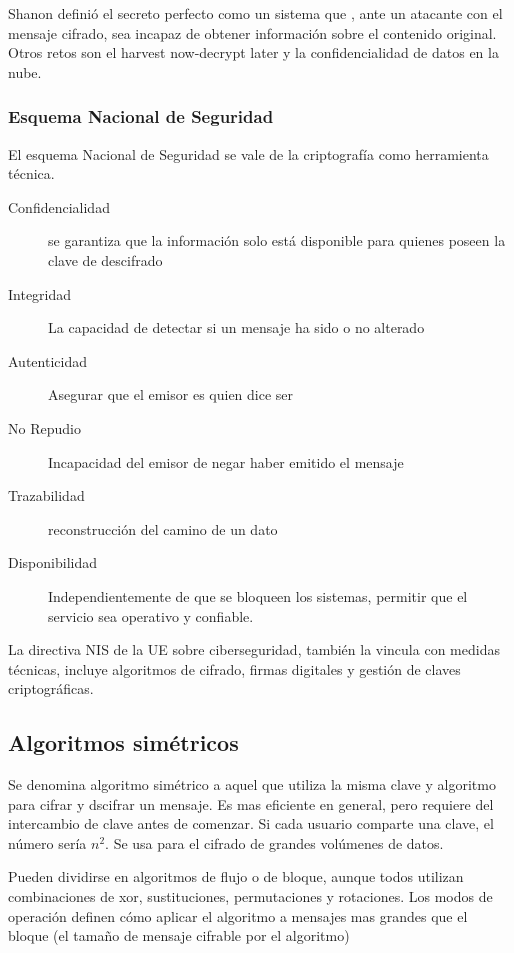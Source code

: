     Shanon definió el secreto perfecto como un sistema que , ante un atacante con el mensaje cifrado, sea incapaz de obtener información sobre el contenido original. Otros retos son el harvest now-decrypt later y la confidencialidad de datos en la nube.

    \subsubsection{Esquema Nacional de Seguridad}
        El esquema Nacional de Seguridad se vale de la criptografía como herramienta técnica.
        \begin{description}
            \item[Confidencialidad] se garantiza que la información solo está disponible para quienes poseen la clave de descifrado
            \item[Integridad] La capacidad de detectar si un mensaje ha sido o no alterado
            \item[Autenticidad] Asegurar que el emisor es quien dice ser
            \item[No Repudio] Incapacidad del emisor de negar haber emitido el mensaje
            \item[Trazabilidad] reconstrucción del camino de un dato
            \item[Disponibilidad] Independientemente de que se bloqueen los sistemas, permitir que el servicio sea operativo y confiable.
        \end{description}

        La directiva NIS de la UE sobre ciberseguridad, también la vincula con medidas técnicas, incluye algoritmos de cifrado, firmas digitales y gestión de claves criptográficas.

\subsection{Algoritmos simétricos} %
    Se denomina algoritmo simétrico a aquel que utiliza la misma clave y algoritmo para cifrar y dscifrar un mensaje. Es mas eficiente en general, pero requiere del intercambio de clave antes de comenzar. Si cada usuario comparte una clave, el número sería \begin{math}n^2\end{math}. Se usa para el cifrado de grandes volúmenes de datos.

    Pueden dividirse en algoritmos de flujo o de bloque, aunque todos utilizan combinaciones de xor, sustituciones, permutaciones y rotaciones. Los modos de operación definen cómo aplicar el algoritmo a mensajes mas grandes que el bloque (el tamaño de mensaje cifrable por el algoritmo)
    
